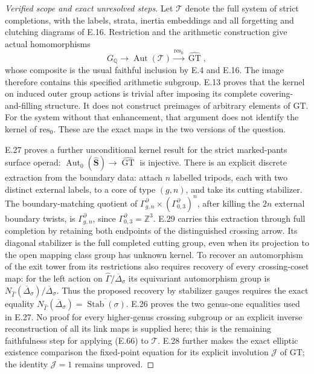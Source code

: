 \begin{proof}[Verified scope and exact unresolved steps]
Let $\mathcal T$ denote the full system of strict
completions, with the labels, strata, inertia embeddings
and all forgetting and clutching diagrams of E.16.
Restriction and the arithmetic construction give actual
homomorphisms
\[
 G_{\mathbb Q}\longrightarrow\operatorname{Aut}(\mathcal T)
       \xrightarrow{\mathrm{res}_0}\widehat{\operatorname{GT}},
                                                               \tag{E.52}
\]
whose composite is the usual faithful inclusion by E.4
and E.16.  The image therefore contains this specified
arithmetic subgroup.  E.13 proves that the kernel on
induced outer group actions is trivial after imposing
its complete covering-and-filling structure.  It does
not construct preimages of arbitrary elements of GT.
For the system without that enhancement, that argument
does not identify the kernel of $\mathrm{res}_0$.
These are the exact maps in the two versions of the
question.

E.27 proves a further unconditional kernel result
for the strict marked-pants surface operad:
$\operatorname{Aut}_0(\widehat{\mathbf S})\to
\widehat{\operatorname{GT}}$ is injective.
There is an explicit discrete extraction from the
boundary data: attach $n$ labelled tripods, each
with two distinct external labels, to a core of
type $(g,n)$, and take its cutting stabilizer.
The boundary-matching quotient of
$\Gamma_{g,n}^{\partial}\times
(\Gamma_{0,3}^{\partial})^n$, after killing the
$2n$ external boundary twists, is
$\Gamma_{g,n}^{\partial}$, since
$\Gamma_{0,3}^{\partial}=\mathbb Z^3$.
E.29 carries this extraction through full completion
by retaining both endpoints of the distinguished
crossing arrow.  Its diagonal stabilizer is the
full completed cutting group, even when its
projection to the open mapping class group has
unknown kernel.
To recover an automorphism of the exit tower
from its restrictions also requires recovery of
every crossing-coset map: for the left action on
$\widehat\Gamma/\overline\Delta_\sigma$ its
equivariant automorphism group is
$N_{\widehat\Gamma}(\overline\Delta_\sigma)/
\overline\Delta_\sigma$.
Thus the proposed recovery by stabilizer gauges
requires the exact equality
$N_{\widehat\Gamma}(\overline\Delta_\sigma)=
\overline{\operatorname{Stab}(\sigma)}$.
E.26 proves the two genus-one equalities used
in E.27.  No proof for every higher-genus
crossing subgroup or an explicit inverse
reconstruction of all its link maps is supplied
here; this is the remaining faithfulness step
for applying (E.66) to $\mathcal T$.
E.28 further makes the exact elliptic existence
comparison the fixed-point equation for its
explicit involution $\mathcal J$ of GT; the
identity $\mathcal J=1$ remains unproved.


\end{proof}

